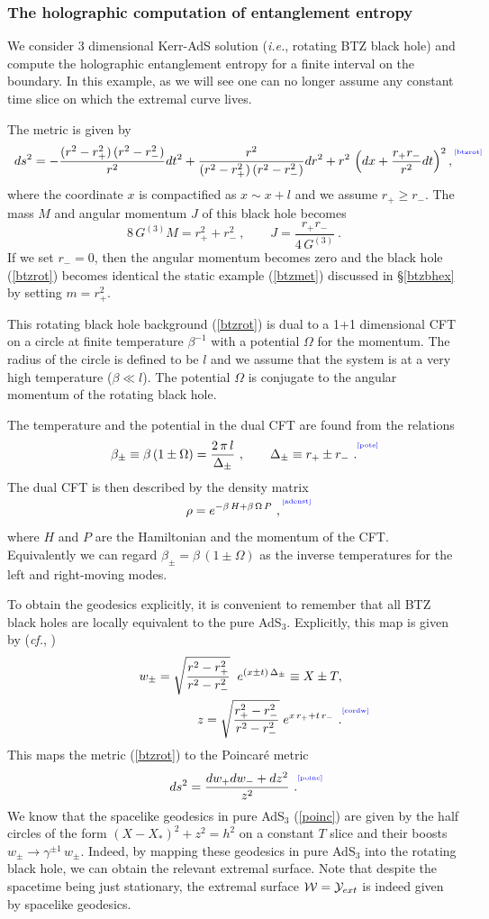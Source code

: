\documentclass[12pt]{article}
\newcommand{\be}{\begin{equation}}
\newcommand{\ee}{\end{equation}}
\def\sec#1{\S \;\ref{#1}}
\def\req#1{(\ref{#1})}
\def\({\left (}
\def\){\right )}
\def\cf{{\it cf.}}
\def\ie{{\it i.e.}}
\def\D{\Delta}
\def\s{\sigma}
\def\CW{{\cal W}}
\def\CY{{\cal Y}}
\def\f#1#2{{\frac{#1}{#2}}}
\def\f#1#2{{\frac{#1}{#2}}}
\def\Label#1{\label{#1}%
{ \color{blue}{\smash{\hbox to0pt{\raise2ex\hbox{\tiny[#1]}\hss}}}}}
\def\Gms{\CW}
\def\Lms{\CY}
\def\ads#1{AdS$_{#1}$}
\def\Dr{\D}
\def\s{\sqrt}
\def\f {\frac}
\def\no{\nonumber \\}
\def\ba{\begin{eqnarray}}
\def\ea{\end{eqnarray}}
\begin{document}
\subsubsection{The holographic computation of entanglement entropy}
We consider 3 dimensional Kerr-AdS solution (\ie, rotating BTZ black hole) and
compute the holographic entanglement entropy for a finite interval on the boundary.
In this example, as we will see one can no longer assume any constant time slice on
which the extremal curve lives.

The metric is given by
%
\be
ds^2=-\f{(r^2-r_{+}^2)\,(r^2-r_{-}^2)}{r^2}dt^2+\f{r^2}{(r^2-r_{+}^2)\,(r^2-r_{-}^2)}dr^2
+r^2\, \left(dx+\f{r_+r_-}{r^2}dt \right)^2,
\Label{btzrot}
\ee
%
where the coordinate $x$ is compactified as $x\sim x+l$ and we
assume $r_{+}\geq r_-$. The mass $M$ and angular momentum $J$ of
this black hole becomes
%
\be 8\,G^{(3)} M= r_+^2+r_-^2 \ , \qquad J=\f{r_+r_-}{4\, G^{(3)} }
\ .   \ee
%
If we set $r_-=0$, then the angular momentum becomes zero and the
black hole (\ref{btzrot}) becomes identical the static example
\req{btzmet} discussed in \sec{btzbhex} by setting
$m=r_+^2$.

This rotating black hole background (\ref{btzrot}) is dual to a 1+1
dimensional CFT on a circle at finite temperature $\beta^{-1}$ with
a potential $\Omega$ for the momentum. The radius of the circle is
defined to be $l$ and we assume that the system is at a very high
temperature ($\beta \ll l$). The potential $\Omega$ is conjugate to
the angular momentum of the rotating black hole.

The temperature and the potential in the dual CFT  are found from
the relations
%
\be
\beta_\pm \equiv \beta\, (1\pm \Omega) = \f{2\,\pi\,  l}{\Dr_\pm} \ , \qquad
\Dr_\pm \equiv r_+ \pm r_-\ .
\Label{pote} \ee
%
The dual CFT is then described by the density matrix
%
\be \rho=e^{-\beta \,H +\beta\, \Omega \, P } \ ,
\Label{adenst} \ee
%
where $H$ and $P$ are the Hamiltonian and the momentum of the CFT. Equivalently we can
regard $\beta_\pm=\beta\,(1\pm \Omega)$ as the inverse temperatures for the left and
right-moving modes.

To obtain the geodesics explicitly, it is convenient to  remember that all BTZ
black holes are locally equivalent to the pure AdS$_3$.  Explicitly, this map is given
by (\cf, \cite{Carlip:1994gc})
%
\ba && w_{\pm}=\s{\f{r^2-r_+^2}{r^2-r_-^2}}\;\; e^{ \(x\pm t\)\,\Dr_\pm }\equiv X\pm T, \no &&
z=\s{\f{r_+^2-r_-^2}{r^2-r_-^2}}\; e^{x\,r_{+}+ t\,r_{-}  } \ .
\Label{cordw} \ea
%
This maps the metric \req{btzrot} to the Poincar\'e metric
%
\be ds^2= \f{dw_{+}dw_{-}+dz^2}{z^2} \ .
\Label{poinc}\ee
%
We know that the spacelike geodesics in pure \ads{3}
\req{poinc} are given by the half circles of the form $(X-X_{*})^2+z^2=h^2$ on a
constant $T$ slice and their boosts $w_{\pm}\to \gamma^{\pm 1 }\,w_{\pm}$. Indeed,
by mapping these geodesics in pure AdS$_3$ into the rotating black hole, we can
obtain the  relevant extremal surface. Note that despite the spacetime being just
stationary, the extremal surface $\Gms = \Lms_{ext}$ is indeed given by spacelike geodesics.
\end{document}
